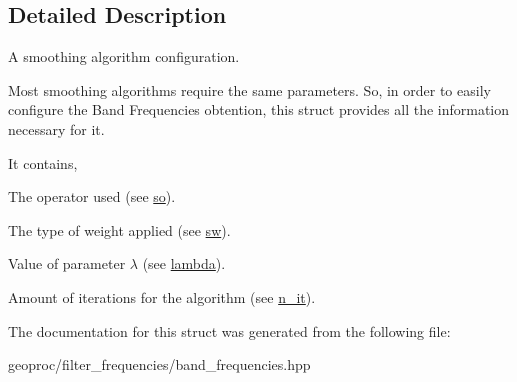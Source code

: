 \subsection{Detailed Description}
A smoothing algorithm configuration. 

Most smoothing algorithms require the same parameters. So, in order to easily configure the Band Frequencies obtention, this struct provides all the information necessary for it.

It contains,
\begin{DoxyItemize}
\item The operator used (see \hyperlink{structgeoproc_1_1filter__frequencies_1_1smoothing__configuration_aa384c253639793b2230cb744444b97c2}{so}).
\item The type of weight applied (see \hyperlink{structgeoproc_1_1filter__frequencies_1_1smoothing__configuration_a29f89d7b9df8ad82ed3759af569d8e67}{sw}).
\item Value of parameter $\lambda$ (see \hyperlink{structgeoproc_1_1filter__frequencies_1_1smoothing__configuration_ad6e8e5ebdd18c3d013e4fbbc3d965dfa}{lambda}).
\item Amount of iterations for the algorithm (see \hyperlink{structgeoproc_1_1filter__frequencies_1_1smoothing__configuration_aa9f5a87ca7e0084e9ac6f3c40d30310c}{n\+\_\+it}). 
\end{DoxyItemize}

The documentation for this struct was generated from the following file\+:\begin{DoxyCompactItemize}
\item 
geoproc/filter\+\_\+frequencies/band\+\_\+frequencies.\+hpp\end{DoxyCompactItemize}
